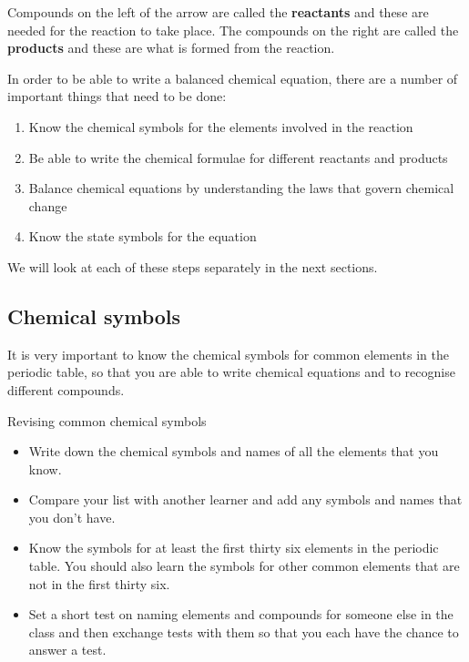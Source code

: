       \label{m38721*id62659}Compounds on the left of the arrow are called the \textbf{reactants} and these are needed for the reaction to take place. The compounds on the right are called the \textbf{products} and these are what is formed from the reaction.\par 
      \label{m38721*id62675}In order to be able to write a balanced chemical equation, there are a number of important things that need to be done:\par 
      \label{m38721*id62681}\begin{enumerate}[noitemsep, label=\textbf{\arabic*}. ] 
            \label{m38721*uid1}\item Know the chemical symbols for the elements involved in the reaction
\label{m38721*uid2}\item Be able to write the chemical formulae for different reactants and products
\label{m38721*uid3}\item Balance chemical equations by understanding the laws that govern chemical change
\label{m38721*uid4}\item Know the state symbols for the equation
\end{enumerate}
      \label{m38721*id62733}We will look at each of these steps separately in the next sections.\par 
    \label{m38721*cid2}
            \subsection*{Chemical symbols}
            \nopagebreak
            
      \label{m38721*id62746}It is very important to know the chemical symbols for common elements in the periodic table, so that you are able to write chemical equations and to recognise different compounds. 
\label{m38721*secfhsst!!!underscore!!!id109}
\vspace{1cm}
            \begin{activity}{Revising common chemical symbols }
            \nopagebreak
      \label{m38721*id62763}\begin{itemize}[noitemsep]
            \label{m38721*uid5}\item Write down the chemical symbols and names of all the elements that you know.
\label{m38721*uid6}\item Compare your list with another learner and add any symbols and names that you don't have.
\label{m38721*uid7}\item Know the symbols for at least the first thirty six elements in the periodic table. You should also learn the symbols for other common elements that are not in the first thirty six.
\label{m38721*uid8}\item Set a short test on naming elements and compounds for someone else in the class and then exchange tests with them so that you each have the chance to answer a test.
\end{itemize}
\end{activity}
    \label{m38721*cid3}
